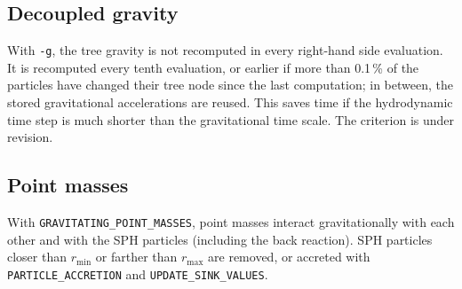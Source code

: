 \documentclass[10pt,fleqn,twoside]{article}
\newcommand{\code}[1]{\texttt{#1}}
\newcommand{\sw}[1]{\texttt{#1}}
\begin{document}
\subsection{Decoupled gravity}
With \code{-g}, the tree gravity is not recomputed in every right-hand side evaluation. It is recomputed every tenth
evaluation, or earlier if more than 0.1\,\% of the particles have changed their tree node since the last computation;
in between, the stored gravitational accelerations are reused. This saves time if the hydrodynamic time step is much
shorter than the gravitational time scale. The criterion is under revision.

\subsection{Point masses}
With \sw{GRAVITATING\_POINT\_MASSES}, point masses interact gravitationally with each other and with the SPH particles
(including the back reaction). SPH particles closer than $r_\mathrm{min}$ or farther than $r_\mathrm{max}$ are removed,
or accreted with \sw{PARTICLE\_ACCRETION} and \sw{UPDATE\_SINK\_VALUES}.




\end{document}
